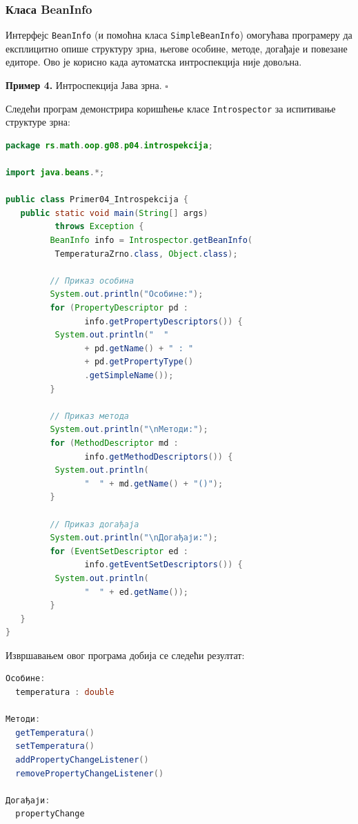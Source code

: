 \subsubsection{Класа BeanInfo}

Интерфејс \texttt{BeanInfo} (и помоћна класа \texttt{SimpleBeanInfo}) омогућава програмеру да експлицитно опише структуру зрна, његове особине, методе, догађаје и повезане едиторе. Ово је корисно када аутоматска интроспекција није довољна.


\bigskip

\noindent \textbf{Пример 4.} Интроспекција Јава зрна. $\square$

\medskip

Следећи програм демонстрира коришћење класе \texttt{Introspector} за испитивање структуре зрна:


\begin{lstlisting}[language=Java]
package rs.math.oop.g08.p04.introspekcija;
 
import java.beans.*;
 
public class Primer04_Introspekcija {
   public static void main(String[] args)
          throws Exception {
         BeanInfo info = Introspector.getBeanInfo(
          TemperaturaZrno.class, Object.class);
 
         // Приказ особина
         System.out.println("Особине:");
         for (PropertyDescriptor pd :
                info.getPropertyDescriptors()) {
          System.out.println("  "
                + pd.getName() + " : "
                + pd.getPropertyType()
                .getSimpleName());
         }
 
         // Приказ метода
         System.out.println("\nМетоди:");
         for (MethodDescriptor md :
                info.getMethodDescriptors()) {
          System.out.println(
                "  " + md.getName() + "()");
         }
 
         // Приказ догађаја
         System.out.println("\nДогађаји:");
         for (EventSetDescriptor ed :
                info.getEventSetDescriptors()) {
          System.out.println(
                "  " + ed.getName());
         }
   }
}
\end{lstlisting}


Извршавањем овог програма добија се следећи резултат:


\begin{lstlisting}[language=Java]
Особине:
  temperatura : double
 
Методи:
  getTemperatura()
  setTemperatura()
  addPropertyChangeListener()
  removePropertyChangeListener()
 
Догађаји:
  propertyChange
\end{lstlisting}


